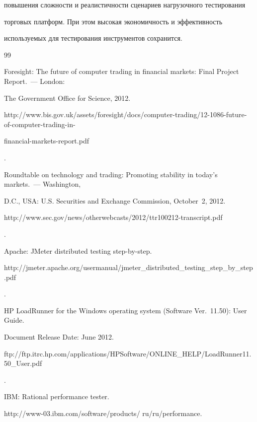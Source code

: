 повышения сложности и реалистичности сценариев нагрузочного тестирования


торговых платформ. При этом высокая экономичность и эффективность


используемых для тестирования инструментов сохранится.





{\small\frenchspacing


{%




\begin{thebibliography}{99}




  Foresight: The future of computer trading in financial markets: Final Project Report.~--- London:


The Government Office for Science, 2012.


  {\sf http://www.bis.gov.uk/assets/foresight/docs/computer-trading/12-1086-future-of-computer-trading-in-


financial-markets-report.pdf}.




  Roundtable on technology and trading: Promoting stability in today's markets.~--- Washington,


D.C., USA: U.S. Securities and Exchange Commission, October~2, 2012. {\sf


http://www.sec.gov/news/otherwebcasts/2012/ttr100212-transcript.pdf}.




  Apache: JMeter distributed testing step-by-step. {\sf


http://jmeter.apache.org/\linebreak usermanual/jmeter\_distributed\_testing\_step\_by\_step.pdf}.




  HP LoadRunner for the Windows operating system (Software Ver.~11.50): User Guide.


Document Release Date: June 2012. {\sf


ftp://ftp.itrc.hp.com/\linebreak applications/HPSoftware/ONLINE\_HELP/LoadRunner11.50\_User.pdf}.




  IBM: Rational performance tester.


  {\sf http://www-03.ibm.com/software/products/ ru/ru/performance}.






\end{thebibliography}}}

